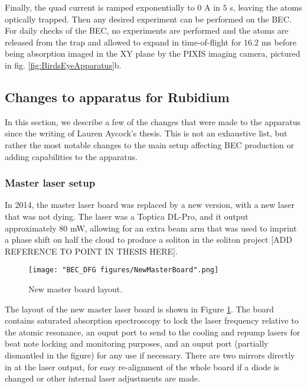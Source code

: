 Finally, the quad current is ramped exponentially to $0$ A in $5$ s, leaving the atoms optically trapped. Then any desired experiment can be performed on the BEC. For daily checks of the BEC, no experiments are performed and the atoms are released from the trap and allowed to expand in time-of-flight for $16.2$ ms before being absorption imaged in the XY plane by the PIXIS imaging camera, pictured in fig. \ref{fig:BirdsEyeApparatus}b.

\subsection{Changes to apparatus for Rubidium}\label{sec:BECchanges}

In this section, we describe a few of the changes that were made to the apparatus since the writing of Lauren Aycock's thesis\cite{AycockThesis}. This is not an exhaustive list, but rather the most notable changes to the main setup affecting BEC production or adding capabilities to the apparatus. 

\subsubsection{Master laser setup}
In 2014, the master laser board was replaced by a new version, with a new laser that was not dying. The laser was a Toptica DL-Pro, and it output approximately $80$ mW, allowing for an extra beam arm that was used to imprint a phase shift on half the cloud to produce a soliton in the soliton project [ADD REFERENCE TO POINT IN THESIS HERE]\cite{Aycock2017}.
\begin{figure}
	\texttt{[image: "BEC\_DFG figures/NewMasterBoard".png]}
\caption[New master board layout]{New master board layout. }
\label{fig:NewMasterBoard}
\end{figure}

The layout of the new master laser board is shown in Figure \ref{fig:NewMasterBoard}. The board contains saturated absorption spectroscopy to lock the laser frequency relative to the atomic resonance, an ouput port to send to the cooling and repump lasers for beat note locking and monitoring purposes, and an ouput port (partially dismantled in the figure) for any use if necessary. There are two mirrors directly in at the laser output, for easy re-alignment of the whole board if a diode is changed or other internal laser adjustments are made. 

